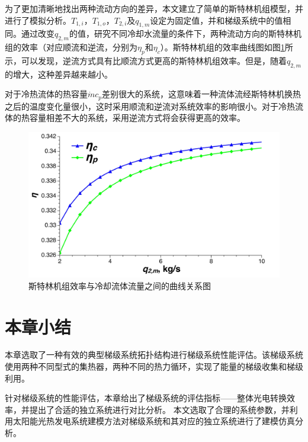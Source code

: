 为了更加清晰地找出两种流动方向的差异，本文建立了简单的斯特林机组模型，并进行了模拟分析。$T_{1,i}，T_{1,o}，T_{2,i}及q_{1,m}$设定为固定值，并和梯级系统中的值相同。通过改变$q_{2,m}$的值，研究不同冷却水流量的条件下，两种流动方向的斯特林机组的效率（对应顺流和逆流，分别为$\eta_p$和$\eta_c$）。斯特林机组的效率曲线图如图\ref{fig:SEAflowtypes}所示，可以发现，逆流方式具有比顺流方式更高的斯特林机组效率。但是，随着$q_{2,m}$的增大，这种差异越来越小。


对于冷热流体的热容量$\dot{m}c_p$差别很大的系统，这意味着一种流体流经斯特林机换热之后的温度变化量很小，这时采用顺流和逆流对系统效率的影响很小。对于冷热流体的热容量相差不大的系统，采用逆流方式将会获得更高的效率。

\noindent \begin{figure}[H]
\begin{center}
	\includegraphics[width = 0.8\columnwidth, angle = 0]{fig/SEAflowtypes}
	\caption{斯特林机组效率与冷却流体流量之间的曲线关系图}
	\label{fig:SEAflowtypes}
\end{center}
\end{figure}

\section{本章小结}

本章选取了一种有效的典型梯级系统拓扑结构进行梯级系统性能评估。该梯级系统使用两种不同型式的集热器，两种不同的热力循环，实现了能量的梯级收集和梯级利用。

针对梯级系统的性能评估，本章给出了梯级系统的评估指标——整体光电转换效率，并提出了合适的独立系统进行对比分析。
本文选取了合理的系统参数，并利用太阳能光热发电系统建模方法对梯级系统和其对应的独立系统进行了建模仿真分析。

